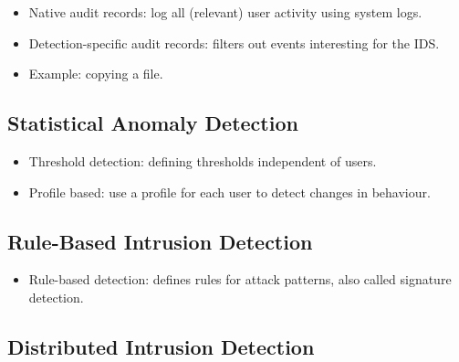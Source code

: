 \begin{frame}
  \begin{itemize}
    \item Native audit records: log all (relevant) user activity using system 
      logs.

    \item Detection-specific audit records: filters out events interesting for 
      the IDS.

    \item Example: copying a file.

  \end{itemize}
\end{frame}

\subsection{Statistical Anomaly Detection}

\begin{frame}
  \begin{itemize}
    \item Threshold detection: defining thresholds independent of users.

    \item Profile based: use a profile for each user to detect changes in 
      behaviour.

  \end{itemize}
\end{frame}

\subsection{Rule-Based Intrusion Detection}

\begin{frame}
  \begin{itemize}
    \item Rule-based detection: defines rules for attack patterns, also called 
      signature detection.
  \end{itemize}
\end{frame}

%

\subsection{Distributed Intrusion Detection}

